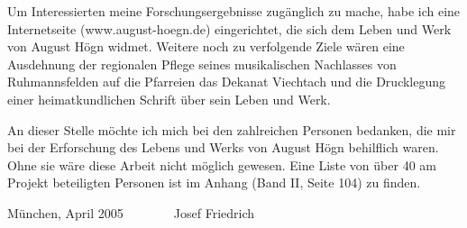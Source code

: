 Um Interessierten meine Forschungsergebnisse zugänglich zu mache, habe
ich eine Internetseite (www.august-hoegn.de) eingerichtet, die sich dem
Leben und Werk von August Högn widmet. Weitere noch zu verfolgende
Ziele wären eine Ausdehnung der regionalen Pflege seines musikalischen
Nachlasses von Ruhmannsfelden auf die Pfarreien das Dekanat Viechtach
und die Drucklegung einer heimatkundlichen Schrift über sein Leben und
Werk.

An dieser Stelle möchte ich mich bei den zahlreichen Personen bedanken,
die mir bei der Erforschung des Lebens und Werks von August Högn
behilflich waren. Ohne sie wäre diese Arbeit nicht möglich gewesen.
Eine Liste von über 40 am Projekt beteiligten Personen ist im Anhang
(Band II, Seite 104) zu finden.

München, April 2005\ \ \ \ \ \ \ \ Josef Friedrich